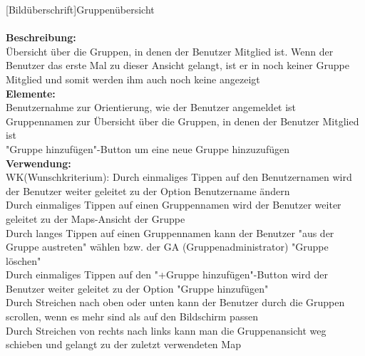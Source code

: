 [Bildüberschrift]Gruppenübersicht\\ \\
\textbf{Beschreibung:}\\
Übersicht über die Gruppen, in denen der Benutzer Mitglied ist. Wenn der Benutzer das erste Mal zu dieser Ansicht gelangt, ist er in noch keiner Gruppe Mitglied und somit werden ihm auch noch keine angezeigt\\
\textbf{Elemente:}\\
Benutzernahme zur Orientierung, wie der Benutzer angemeldet ist\\
Gruppennamen zur Übersicht über die Gruppen, in denen der Benutzer Mitglied ist\\
"Gruppe hinzufügen"-Button um eine neue Gruppe hinzuzufügen\\
\textbf{Verwendung:}\\
WK(Wunschkriterium): Durch einmaliges Tippen auf den Benutzernamen wird der Benutzer weiter geleitet zu der Option Benutzername ändern\\
Durch einmaliges Tippen auf einen Gruppennamen wird der Benutzer weiter geleitet zu der Maps-Ansicht der Gruppe\\
Durch langes Tippen auf einen Gruppennamen kann der Benutzer "aus der Gruppe austreten" wählen bzw. der GA (Gruppenadministrator) "Gruppe löschen"\\
Durch einmaliges Tippen auf den "+Gruppe hinzufügen"-Button wird der Benutzer weiter geleitet zu der Option "Gruppe hinzufügen"\\
Durch Streichen nach oben oder unten kann der Benutzer durch die Gruppen scrollen, wenn es mehr sind als auf den Bildschirm passen\\
Durch Streichen von rechts nach links kann man die Gruppenansicht weg schieben und gelangt zu der zuletzt verwendeten Map\\ \\

